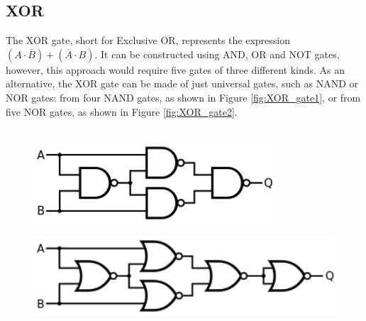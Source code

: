 \subsection{XOR}
    The XOR gate, short for Exclusive OR, represents the expression $(A\cdot {\overline {B}})+({\overline {A}}\cdot B)$.
    It can be constructed using AND, OR and NOT gates, however, this approach would require five gates of three different kinds. 
    As an alternative, the XOR gate can be made of just universal gates, such as NAND or NOR gates: from four NAND gates, as shown in Figure \ref{fig:XOR_gate1}, or from five NOR gates, as shown in Figure \ref{fig:XOR_gate2}. \\\\	
    \begin{figure}[H]   
        \begin{minipage}{0.5\textwidth}
            \centering
            \includegraphics[width=0.8\textwidth]{figures/circuits/XOR1.png}
            \label{fig:NOR_gate1} 
        \end{minipage}
        \begin{minipage}{0.5\textwidth}
            \centering
            \includegraphics[width=1\textwidth]{figures/circuits/XOR2.png}
            \label{fig:NOR_gate2} 
        \end{minipage}
	\end{figure}
    
